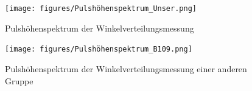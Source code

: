 \documentclass{article}
\begin{document}
\begin{figure}
    \centering
    \texttt{[image: figures/Pulshöhenspektrum\_Unser.png]}
    \caption{Pulshöhenspektrum der Winkelverteilungsmessung}
    \label{fig:PulshoheWinkelverteilung}
\end{figure}
\begin{figure}
    \centering
    \texttt{[image: figures/Pulshöhenspektrum\_B109.png]}
    \caption{Pulshöhenspektrum der Winkelverteilungsmessung einer anderen Gruppe}
    \label{fig:PulshoheWinkelverteilungAndereGruppe}
\end{figure}
\newpage

\printbibliography[heading=bibintoc]
\end{document}
